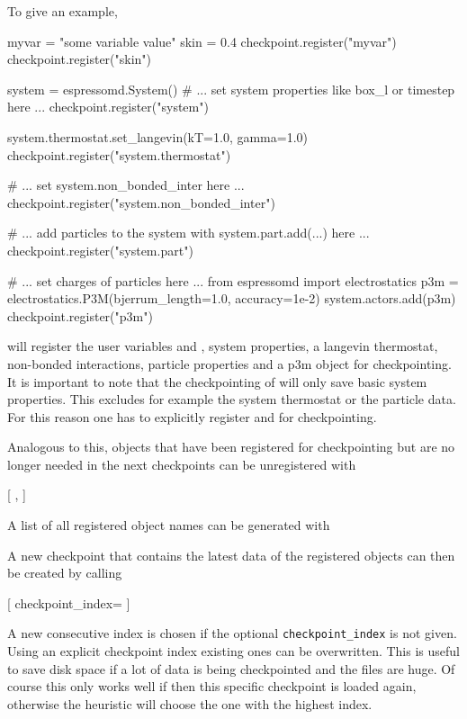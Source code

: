 To give an example,
\begin{pycode}
    myvar = "some variable value"
    skin = 0.4
    checkpoint.register("myvar")
    checkpoint.register("skin")
    
    system = espressomd.System()
    # ... set system properties like box_l or timestep here ...
    checkpoint.register("system")
    
    system.thermostat.set_langevin(kT=1.0, gamma=1.0)
    checkpoint.register("system.thermostat")
    
    # ... set system.non_bonded_inter here ...
    checkpoint.register("system.non_bonded_inter")
    
    # ... add particles to the system with system.part.add(...) here ...
    checkpoint.register("system.part")
    
    # ... set charges of particles here ...
    from espressomd import electrostatics
    p3m = electrostatics.P3M(bjerrum_length=1.0, accuracy=1e-2)
    system.actors.add(p3m)
    checkpoint.register("p3m")
\end{pycode}

will register the user variables  and , system 
properties, a langevin thermostat, non-bonded interactions, particle 
properties and a p3m object for checkpointing. It is important to note that 
the checkpointing of  will only save basic system properties. This 
excludes for example the system thermostat or the particle data. For this 
reason one has to explicitly register  and 
 for checkpointing.

Analogous to this, objects that have been registered for checkpointing 
but are no longer needed in the next checkpoints can be unregistered with
\begin{pysyntax}
  [
    ,
  ]
\end{pysyntax}

\vspace{2em}
A list of all registered object names can be generated with
\begin{pysyntax}
\end{pysyntax}

\vspace{2em}
A new checkpoint that contains the latest data of the registered
objects can then be created by calling
\begin{pysyntax}
  [
    checkpoint_index=
  ]
\end{pysyntax}
A new consecutive index is chosen if the optional
\texttt{checkpoint_index} is not given.  Using an explicit checkpoint
index existing ones can be overwritten.  This is useful to save disk
space if a lot of data is being checkpointed and the files are huge.
Of course this only works well if then this specific checkpoint is
loaded again, otherwise the heuristic will choose the one with the
highest index.

